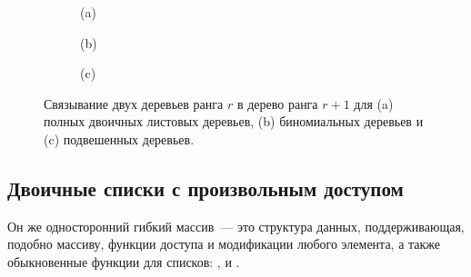 \begin{frame}[fragile]{}

\begin{figure}
  \centering
  \begin{subfigure}[b]{0.45\textwidth}
    \centering
    \par\vspace{0.2cm}
    (a)
  \end{subfigure}
  \begin{subfigure}[b]{0.45\textwidth}
    \centering
    \par\vspace{0.2cm}
    (b)
  \end{subfigure}\par\vspace{0.2cm}
  \begin{subfigure}[b]{1\textwidth}
    \centering
    \par\vspace{0.2cm}
    (c)
  \end{subfigure}

  \caption{Связывание двух деревьев ранга $r$ в дерево ранга $r+1$ для
    (a) полных двоичных листовых деревьев, (b) биномиальных деревьев и
    (c) подвешенных деревьев.}
  \label{fig:9.3}
\end{figure}

\end{frame}

\begin{comment}
В предыдущих главах мы уже видели несколько реализаций куч,
основанных на двоичной арифметике и биномиальных деревьях. Теперь мы
сначала рассмотрим простое числовое представление для списков с
произвольным доступом. Затем мы исследуем насколько вариаций двоичной
арифметики, позволяющих улучшить асимптотические показатели.
\end{comment}

\subsection{Двоичные списки с произвольным доступом}
\label{sc:9.2.1}

\begin{frame}[fragile]{}
Он же односторонний гибкий массив~--- это структура данных,
поддерживающая, подобно массиву, функции доступа и модификации любого
элемента, а также обыкновенные функции для списков: ,
 и . 

%
\inputminted[firstline=4]{haskell}{code/RandomAccessList.lhs}
\end{frame}

